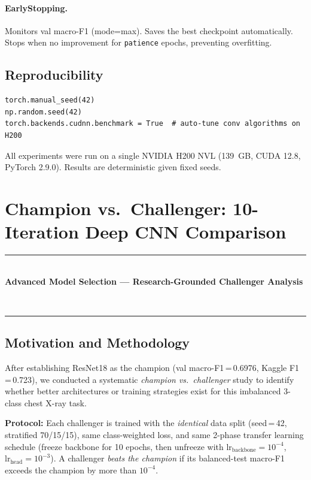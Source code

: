 \documentclass[11pt, letterpaper]{article}
\begin{document}
\paragraph{EarlyStopping.}
Monitors val macro-F1 (mode=max). Saves the best checkpoint automatically.
Stops when no improvement for \texttt{patience} epochs, preventing overfitting.

\subsection{Reproducibility}
\begin{lstlisting}[caption={Reproducibility seeds set at startup}]
torch.manual_seed(42)
np.random.seed(42)
torch.backends.cudnn.benchmark = True  # auto-tune conv algorithms on H200
\end{lstlisting}
All experiments were run on a single NVIDIA H200 NVL (139~GB, CUDA 12.8,
PyTorch 2.9.0). Results are deterministic given fixed seeds.

\newpage
\section{Champion vs.\ Challenger: 10-Iteration Deep CNN Comparison}
\label{sec:cc}
{\color{devcolor}\rule{\linewidth}{1.5pt}\\
\textbf{Advanced Model Selection --- Research-Grounded Challenger Analysis}}\\[-0.5em]
{\color{devcolor}\rule{\linewidth}{0.5pt}}

\subsection{Motivation and Methodology}

After establishing ResNet18 as the champion (val macro-F1\,=\,0.6976,
Kaggle F1\,=\,0.723), we conducted a systematic \emph{champion vs.\ challenger}
study to identify whether better architectures or training strategies exist for
this imbalanced 3-class chest X-ray task.

\textbf{Protocol:} Each challenger is trained with the \emph{identical} data
split (seed\,=\,42, stratified 70/15/15), same class-weighted loss, and same
2-phase transfer learning schedule (freeze backbone for 10 epochs, then unfreeze
with $\text{lr}_\text{backbone}=10^{-4}$, $\text{lr}_\text{head}=10^{-3}$).
A challenger \emph{beats the champion} if its balanced-test macro-F1 exceeds
the champion by more than $10^{-4}$.
\end{document}
